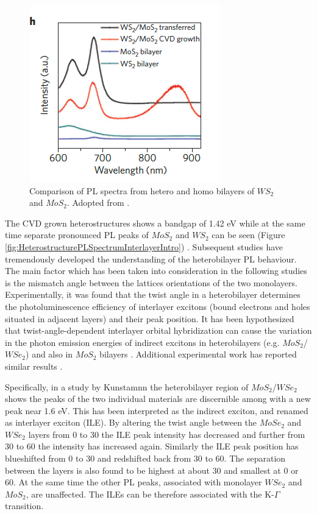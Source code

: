 \begin{figure}[h]
	\begin{center}
		\includegraphics[scale=1]{Heterostructures/HeterostructurePLSpectrumIntroComparison.png}
		\caption{Comparison of PL spectra from hetero and homo bilayers of $WS_2$ and $MoS_2$. Adopted from \cite{Gong2014}.}
		\label{fig:HeterostructurePLSpectrumIntroComparison}
	\end{center}
\end{figure}

The CVD grown heterostructures shows a bandgap of 1.42 eV while at the same time separate pronounced PL peaks of $MoS_2$ and $WS_2$ can be seen (Figure \ref{fig:HeterostructurePLSpectrumInterlayerIntro}) \cite{Gong2014}. Subsequent studies have tremendously developed the understanding of the heterobilayer PL behaviour. The main factor which has been taken into consideration in the following studies is the mismatch angle between the lattices orientations of the two monolayers. Experimentally, it was found that the twist angle in a heterobilayer determines the photoluminescence efficiency of interlayer excitons (bound  electrons and holes situated in adjacent layers) and their peak position. It has been hypothesized that twist-angle-dependent interlayer orbital hybridization can cause the variation in the photon emission energies of indirect excitons in heterobilayers (e.g. $MoS_2$/$WSe_2$) and also in $MoS_2$ bilayers \cite{Nayak2017}. Additional experimental work has reported similar results \cite{Heo2015}\cite{Liu2014a}. 

Specifically, in a study by Kunstamnn \cite{Kunstmann2018} the heterobilayer region of $MoS_2$/$WSe_2$ shows the peaks of the two individual materials are discernible among with a new peak near 1.6 eV. This has been interpreted as the indirect exciton, and renamed as interlayer exciton (ILE). By altering the twist angle between the $MoSe_2$ and $WSe_2$ layers from 0{\degree} to 30{\degree} the ILE peak intensity has decreased and further from 30{\degree} to 60{\degree} the intensity has increased again. Similarly the ILE peak position has blueshifted from 0{\degree} to 30{\degree} and redshifted back from 30{\degree} to 60{\degree}. The separation between the layers is also found to be highest at about 30{\degree} and smallest at 0{\degree} or 60{\degree}. At the same time the other PL peaks, associated with monolayer $WSe_2$ and $MoS_2$, are unaffected. The ILEs can be therefore associated with the K-$\Gamma$ transition.

